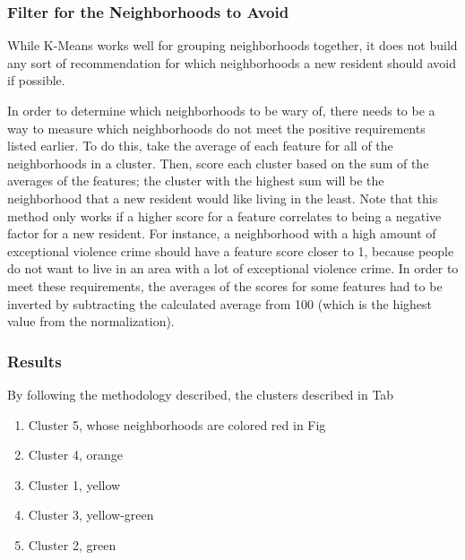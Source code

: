 \documentclass[conference]{IEEEtran}
\begin{document}
\subsubsection{Filter for the Neighborhoods to Avoid}
While K-Means works well for grouping neighborhoods together, it does not build any sort of recommendation for which neighborhoods
a new resident should avoid if possible.

In order to determine which neighborhoods to be wary of, there needs to be a way to measure which neighborhoods do not
meet the positive requirements listed earlier.  To do this, take the average of each feature for all of the neighborhoods
in a cluster.  Then, score each cluster based on the sum of the averages of the features; the cluster with the highest sum will be the neighborhood
that a new resident would like living in the least.  Note that this method only works if a higher score for a feature correlates to
being a negative factor for a new resident.  For instance, a neighborhood with a high amount of exceptional violence crime
should have a feature score closer to 1, because people do not want to live in an area with a lot of exceptional violence crime.
In order to meet these requirements, the averages of the scores for some features had to be inverted
by subtracting the calculated average from 100 (which is the highest value from the normalization).

\subsubsection{Results}

By following the methodology described, the clusters described in Tab
\begin{enumerate}
	\item Cluster 5, whose neighborhoods are colored red in Fig
	\item Cluster 4, orange
	\item Cluster 1, yellow
	\item Cluster 3, yellow-green
	\item Cluster 2, green
\end{enumerate}
\end{document}
